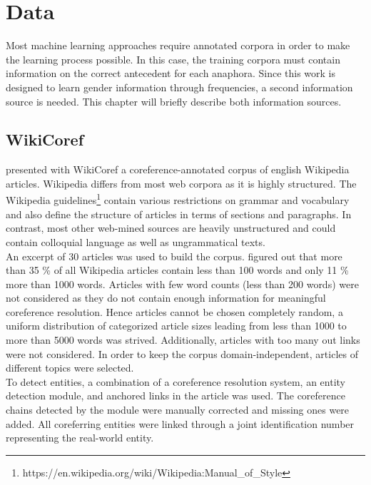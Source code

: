 \chapter{Data}
\label{sec:Data}

Most machine learning approaches require annotated corpora in order to make the learning process possible. In this case, the training corpora must contain information on the correct antecedent for each anaphora. Since this work is designed to learn gender information through frequencies, a second information source is needed. This chapter will briefly describe both information sources.

\section{WikiCoref }
\label{wikicorefSec}
\cite{wikicoref2016} presented with WikiCoref a coreference-annotated corpus of english Wikipedia articles. Wikipedia differs from most web corpora as it is highly structured. The Wikipedia guidelines\footnote{https://en.wikipedia.org/wiki/Wikipedia:Manual\_of\_Style} contain various restrictions on grammar and vocabulary and also define the structure of articles in terms of sections and paragraphs. In contrast, most other web-mined sources are heavily unstructured and could contain colloquial language as well as ungrammatical texts. \\
An excerpt of 30 articles was used to build the corpus. \citep{wikicoref2016} figured out that more than 35 \% of all Wikipedia articles contain less than 100 words and only 11 \% more than 1000 words. Articles with few word counts (less than 200 words) were not considered as they do not contain enough information for meaningful coreference resolution. Hence articles cannot be chosen completely random, a uniform distribution of categorized article sizes leading from less than 1000 to more than 5000 words was strived. Additionally, articles with too many out links were not considered. In order to keep the corpus domain-independent, articles of different topics were selected.\\

To detect entities, a combination of a coreference resolution system, an entity detection module, and anchored links in the article was used. The coreference chains detected by the module were manually corrected and missing ones were added. All coreferring entities were linked through a joint identification number representing the real-world entity.

